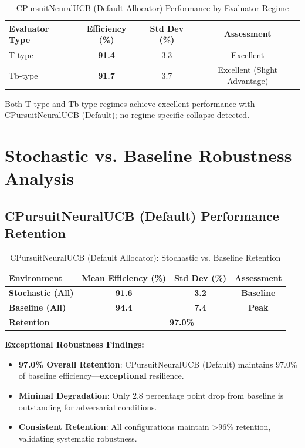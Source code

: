 \documentclass[12pt,a4paper]{article}
\newcommand{\success}[1]{\textcolor{accentgreen}{\textbf{#1}}}
\begin{document}
\begin{table}[H]
\centering
\caption{CPursuitNeuralUCB (Default Allocator) Performance by Evaluator Regime}
\begin{tabular}{@{}lccc@{}}
\toprule
\textbf{Evaluator Type} & \textbf{Efficiency (\%)} & \textbf{Std Dev (\%)} & \textbf{Assessment} \\
\midrule
T-type & \success{91.4} & 3.3 & Excellent \\
Tb-type & \success{91.7} & 3.7 & Excellent (Slight Advantage) \\
\bottomrule
\end{tabular}
\end{table}

Both T-type and Tb-type regimes achieve excellent performance with CPursuitNeuralUCB (Default); no regime-specific collapse detected.

\section{Stochastic vs. Baseline Robustness Analysis}

\subsection{CPursuitNeuralUCB (Default) Performance Retention}

\begin{table}[H]
\centering
\caption{CPursuitNeuralUCB (Default Allocator): Stochastic vs. Baseline Retention}
\begin{tabular}{@{}lccc@{}}
\toprule
\textbf{Environment} & \textbf{Mean Efficiency (\%)} & \textbf{Std Dev (\%)} & \textbf{Assessment} \\
\midrule
\success{Stochastic (All)} & \success{91.6} & \success{3.2} & \success{Baseline} \\
\success{Baseline (All)} & \success{94.4} & \success{7.4} & \success{Peak} \\
\textbf{Retention} & \multicolumn{3}{c}{\textbf{\success{97.0\%}}} \\
\bottomrule
\end{tabular}
\end{table}

\textbf{Exceptional Robustness Findings:}

\begin{itemize}
    \item \success{97.0\% Overall Retention}: CPursuitNeuralUCB (Default) maintains 97.0\% of baseline efficiency—\textbf{exceptional} resilience.
    \item \success{Minimal Degradation}: Only 2.8 percentage point drop from baseline is outstanding for adversarial conditions.
    \item \success{Consistent Retention}: All configurations maintain >96\% retention, validating systematic robustness.
\end{itemize}
\end{document}
